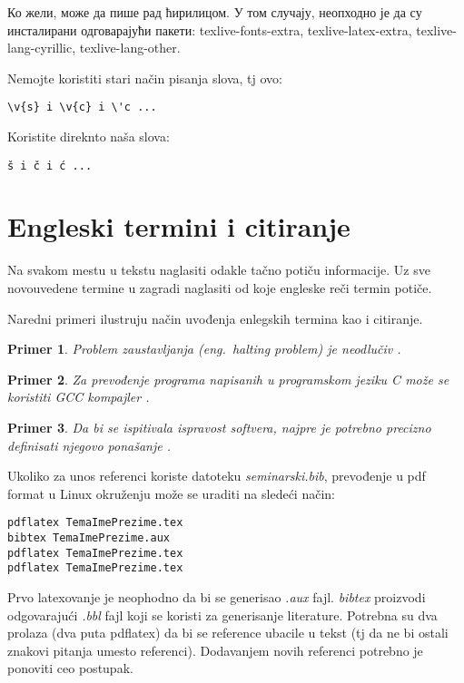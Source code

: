 \documentclass[a4paper]{article}
\newtheorem{primer}{Primer}[section]
\begin{document}
Ко жели, може да пише рад ћирилицом. У том случају, неопходно је да су инсталирани одговарајући пакети: texlive-fonts-extra, texlive-latex-extra, texlive-lang-cyrillic, texlive-lang-other. 

Nemojte koristiti stari način pisanja slova, tj ovo:
\begin{verbatim}
\v{s} i \v{c} i \'c ...
\end{verbatim}
Koristite direknto naša slova:	
\begin{verbatim}
š i č i ć ... 
\end{verbatim}


\section{Engleski termini i citiranje}	
\label{sec:termini_i_citiranje}

Na svakom mestu u tekstu naglasiti odakle tačno potiču informacije. Uz sve novouvedene termine u zagradi naglasiti od koje engleske reči termin potiče. 

Naredni primeri ilustruju način uvođenja enlegskih termina kao i citiranje.

\begin{primer}
Problem zaustavljanja (eng.~{\em halting problem}) je neodlučiv \cite{haltingproblem}.
\end{primer}

\begin{primer}
Za prevođenje programa napisanih u programskom jeziku C može se koristiti GCC kompajler \cite{gcc}.
\end{primer}

\begin{primer}
 Da bi se ispitivala ispravost softvera, najpre je potrebno precizno definisati njegovo ponašanje \cite{laski2009software}. 
\end{primer}

Ukoliko za unos referenci koriste datoteku {\em seminarski.bib},  prevođenje u pdf format u Linux okruženju može se uraditi na sledeći način:
\begin{verbatim}
pdflatex TemaImePrezime.tex 
bibtex TemaImePrezime.aux 
pdflatex TemaImePrezime.tex 
pdflatex TemaImePrezime.tex 
\end{verbatim}
Prvo latexovanje je neophodno da bi se generisao {\em .aux} fajl. {\em bibtex} proizvodi odgovarajući {\em .bbl} fajl koji se koristi za generisanje literature. 
Potrebna su dva prolaza (dva puta pdflatex) da bi se reference ubacile u tekst (tj da ne bi ostali znakovi pitanja umesto referenci). Dodavanjem novih referenci potrebno je ponoviti ceo postupak.  
\end{document}
